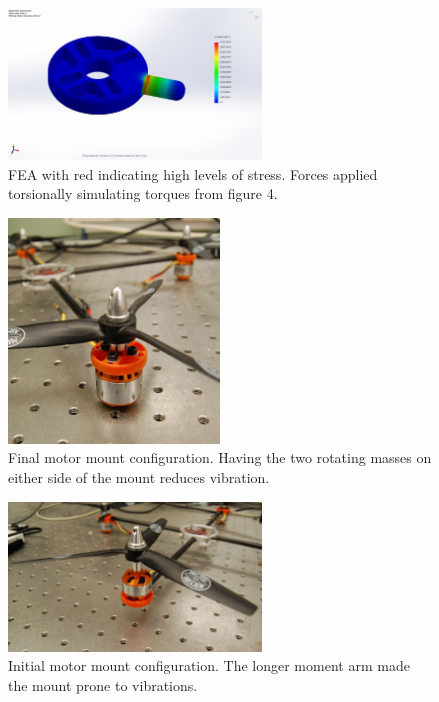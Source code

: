 \documentclass[12pt,letterpaper]{article} \usepackage[margin=1in]{geometry}
\begin{document}
\begin{figure}[!h]
	\centering
	\includegraphics[width=0.6\textwidth]{img/fea_strain.jpg}
	\caption{FEA with red indicating high levels of stress. Forces applied torsionally simulating torques from figure 4.}
	\label{fig:feastrain}
\end{figure}

\begin{figure}[!h]
	\centering
	\includegraphics[width=0.5\textwidth]{img/motor_mount_final.jpg}
	\caption{Final motor mount configuration. Having the two rotating masses on either side of the mount reduces vibration.}
	\label{fig:mmf}
\end{figure}

\begin{figure}[!h]
	\centering
	\includegraphics[width=0.6\textwidth]{img/motor_mount_initial.jpg}
	\caption{Initial motor mount configuration. The longer moment arm made the mount prone to vibrations.}
	\label{fig:mmi}
\end{figure}
\end{document}
